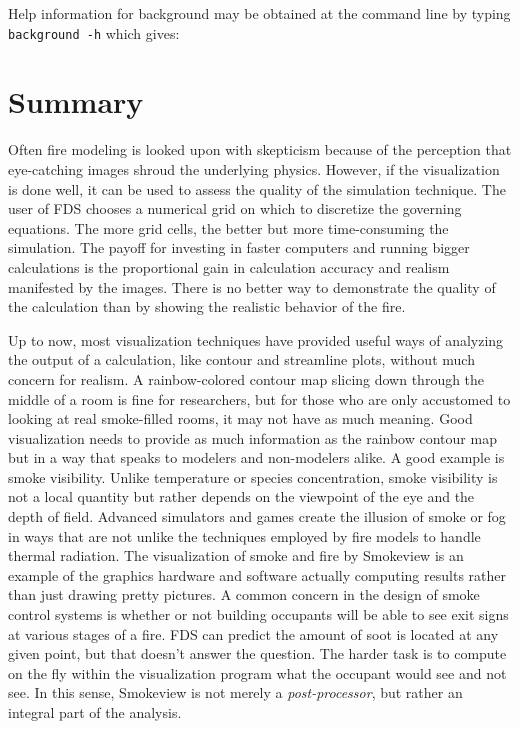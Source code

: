\documentclass[11pt,twoside]{book}
\begin{document}
Help information for background may be obtained at the command line by typing {\tt background -h} which gives:




\chapter{Summary}
Often fire modeling is looked upon with skepticism because of the
perception that eye-catching images shroud the underlying physics.
However, if the visualization is done well, it can be used to
assess the quality of the simulation technique. The user of FDS
chooses a numerical grid on which to discretize the governing
equations. The more grid cells, the better but more time-consuming
the simulation. The payoff for investing in faster computers and
running bigger calculations is the proportional gain in calculation accuracy and realism
manifested by the images. There is no better way to demonstrate
the quality of the calculation than by showing the realistic
behavior of the fire.

Up to now, most visualization techniques have provided useful ways
of analyzing the output of a calculation, like contour and
streamline plots, without much concern for realism. A
rainbow-colored contour map slicing down through the middle of a
room is fine for researchers, but for those who are only
accustomed to looking at real smoke-filled rooms, it may not have
as much meaning. Good visualization needs to provide as much
information as the rainbow contour map but in a way that speaks to
modelers and non-modelers alike. A good example is smoke
visibility. Unlike temperature or species concentration, smoke
visibility is not a local quantity but rather depends on the
viewpoint of the eye and the depth of field. Advanced simulators
and games create the illusion of smoke or fog in ways that are not
unlike the techniques employed by fire models to handle thermal
radiation. The visualization of smoke and fire by Smokeview is an
example of the graphics hardware and software actually computing
results rather than just drawing pretty pictures. A common concern
in the design of smoke control systems is whether or not building
occupants will be able to see exit signs at various stages of a
fire. FDS can predict the amount of soot is located at any given
point, but that doesn't answer the question. The harder task is to
compute on the fly within the visualization program what the
occupant would see and not see. In this sense, Smokeview is not
merely a {\em post-processor}, but rather an integral part of the
analysis.
\end{document}
